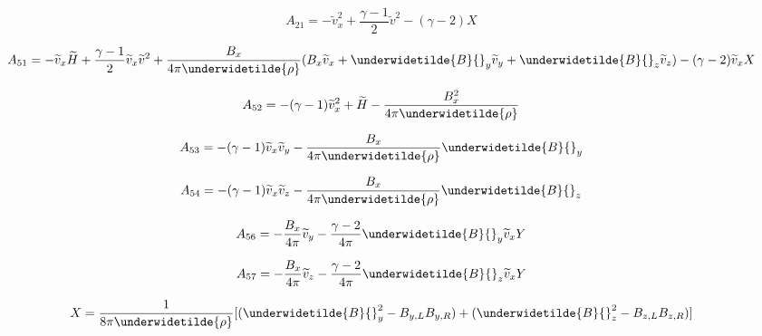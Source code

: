 \begin{equation}
\displaystyle
A_{21} = - \widetilde{v}_{x}^2 + \frac{\gamma-1}2 \widetilde{v}^2 - 
(\gamma -2) X 
\end{equation}

\begin{equation}
\displaystyle
A_{51} = - \widetilde{v}_{x} \widetilde{H} + 
\frac{\gamma-1}2 \widetilde{v}_{x} \widetilde{v}^2 +
\frac{B_{x}}{4 \pi \underwidetilde{\rho}}
(B_{x} \widetilde{v}_{x} + \underwidetilde{B}{}_{y} \widetilde{v}_{y} 
+ \underwidetilde{B}{}_{z} \widetilde{v}_{z} ) 
- (\gamma - 2) \widetilde{v}_{x} X
\vspace{-8pt} 
\end{equation}

\begin{equation}
\displaystyle
A_{52} = - (\gamma - 1) \widetilde{v}_{x}^2 + \widetilde{H} - 
\frac{B_{x}^2}{4 \pi \underwidetilde{\rho}}
\vspace{-8pt} 
\end{equation}

\begin{equation}
\displaystyle
A_{53} = - (\gamma - 1) \widetilde{v}_{x} \widetilde{v}_{y} -
\frac{B_{x}}{4 \pi \underwidetilde{\rho}} \underwidetilde{B}{}_{y}
\vspace{-8pt} 
\end{equation}

\begin{equation}
\displaystyle
A_{54} = - (\gamma - 1) \widetilde{v}_{x} \widetilde{v}_{z} -
\frac{B_{x}}{4 \pi \underwidetilde{\rho}} \underwidetilde{B}{}_{z}
\vspace{-8pt} 
\end{equation}

\begin{equation}
\displaystyle
A_{56} = - \frac{B_{x}}{4 \pi} \widetilde{v}_{y} - 
\frac{\gamma -2}{4 \pi} \underwidetilde{B}{}_{y} \widetilde{v}_{x} Y
\end{equation}

\begin{equation}
\displaystyle
A_{57} = - \frac{B_{x}}{4 \pi} \widetilde{v}_{z} - 
\frac{\gamma -2}{4 \pi} \underwidetilde{B}{}_{z} \widetilde{v}_{x} Y
\end{equation}

\begin{equation}
X = \frac1{8 \pi \underwidetilde{\rho}} 
[ ( \underwidetilde{B}{}_{y}^2 - B_{y,L} B_{y,R} ) 
+  ( \underwidetilde{B}{}_{z}^2 - B_{z,L} B_{z,R} ) ]
\vspace{-8pt} 
\end{equation}

